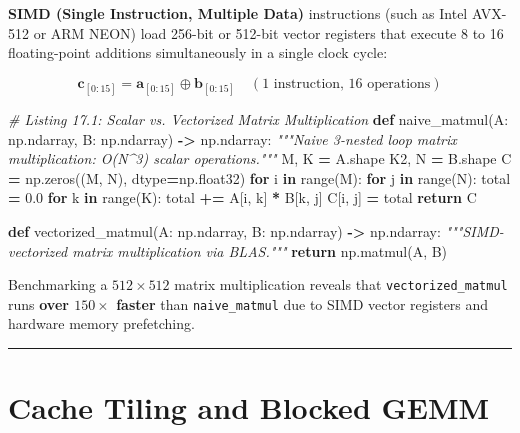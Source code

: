\documentclass[
  letterpaper,
]{scrbook}
\newenvironment{Shaded}{\begin{snugshade}}{\end{snugshade}}
\newcommand{\BuiltInTok}[1]{#1}
\newcommand{\CommentTok}[1]{\textcolor[rgb]{0.56,0.35,0.01}{\textit{#1}}}
\newcommand{\ControlFlowTok}[1]{\textcolor[rgb]{0.13,0.29,0.53}{\textbf{#1}}}
\newcommand{\FloatTok}[1]{\textcolor[rgb]{0.00,0.00,0.81}{#1}}
\newcommand{\KeywordTok}[1]{\textcolor[rgb]{0.13,0.29,0.53}{\textbf{#1}}}
\newcommand{\NormalTok}[1]{#1}
\newcommand{\OperatorTok}[1]{\textcolor[rgb]{0.81,0.36,0.00}{\textbf{#1}}}
\begin{document}
\textbf{SIMD (Single Instruction, Multiple Data)} instructions (such as
Intel AVX-512 or ARM NEON) load 256-bit or 512-bit vector registers that
execute 8 to 16 floating-point additions simultaneously in a single
clock cycle:

\[\mathbf{c}_{[0:15]} = \mathbf{a}_{[0:15]} \oplus \mathbf{b}_{[0:15]} \quad (1\text{ instruction, 16 operations})\]

\begin{Shaded}
\begin{Highlighting}[]
\CommentTok{\# Listing 17.1: Scalar vs. Vectorized Matrix Multiplication}
\KeywordTok{def}\NormalTok{ naive\_matmul(A: np.ndarray, B: np.ndarray) }\OperatorTok{{-}\textgreater{}}\NormalTok{ np.ndarray:}
    \CommentTok{"""Naive 3{-}nested loop matrix multiplication: O(N\^{}3) scalar operations."""}
\NormalTok{    M, K }\OperatorTok{=}\NormalTok{ A.shape}
\NormalTok{    K2, N }\OperatorTok{=}\NormalTok{ B.shape}
\NormalTok{    C }\OperatorTok{=}\NormalTok{ np.zeros((M, N), dtype}\OperatorTok{=}\NormalTok{np.float32)}
    \ControlFlowTok{for}\NormalTok{ i }\KeywordTok{in} \BuiltInTok{range}\NormalTok{(M):}
        \ControlFlowTok{for}\NormalTok{ j }\KeywordTok{in} \BuiltInTok{range}\NormalTok{(N):}
\NormalTok{            total }\OperatorTok{=} \FloatTok{0.0}
            \ControlFlowTok{for}\NormalTok{ k }\KeywordTok{in} \BuiltInTok{range}\NormalTok{(K):}
\NormalTok{                total }\OperatorTok{+=}\NormalTok{ A[i, k] }\OperatorTok{*}\NormalTok{ B[k, j]}
\NormalTok{            C[i, j] }\OperatorTok{=}\NormalTok{ total}
    \ControlFlowTok{return}\NormalTok{ C}

\KeywordTok{def}\NormalTok{ vectorized\_matmul(A: np.ndarray, B: np.ndarray) }\OperatorTok{{-}\textgreater{}}\NormalTok{ np.ndarray:}
    \CommentTok{"""SIMD{-}vectorized matrix multiplication via BLAS."""}
    \ControlFlowTok{return}\NormalTok{ np.matmul(A, B)}
\end{Highlighting}
\end{Shaded}

Benchmarking a \(512 \times 512\) matrix multiplication reveals that
\texttt{vectorized\_matmul} runs \textbf{over \(150\times\) faster} than
\texttt{naive\_matmul} due to SIMD vector registers and hardware memory
prefetching.

\begin{center}\rule{0.5\linewidth}{0.5pt}\end{center}

\section{Cache Tiling and Blocked
GEMM}\label{cache-tiling-and-blocked-gemm}
\end{document}
